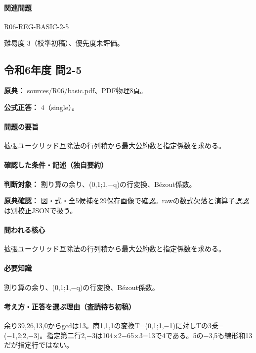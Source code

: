 \paragraph{関連問題} \hyperref[q:r06-reg-basic-2-5]{R06-REG-BASIC-2-5}

\par 難易度 3（校準初稿）、優先度未評価。

\subsection{令和6年度 問2-5}
\label{q:r06-reg-basic-2-5}

\noindent\textbf{原典：} sources/R06/basic.pdf、PDF物理8頁。

\textbf{公式正答：} 4（single）。

\paragraph{問題の要旨} 拡張ユークリッド互除法の行列積から最大公約数と指定係数を求める。

\paragraph{確認した条件・記述（独自要約）}\mbox{}\par

\noindent\textbf{判断対象：} 割り算の余り、(0,1;1,−q)の行変換、Bézout係数。\par

\noindent\textbf{原典確認：} 図・式・全5候補を29保存画像で確認。rawの数式欠落と演算子誤認は別校正JSONで扱う。\par

\paragraph{問われる核心} 拡張ユークリッド互除法の行列積から最大公約数と指定係数を求める。

\paragraph{必要知識} 割り算の余り、(0,1;1,−q)の行変換、Bézout係数。

\paragraph{考え方・正答を選ぶ理由（査読待ち初稿）} 余り39,26,13,0からgcdは13。商1,1,1の変換T=\allowbreak{}(0,1;1,−1)に対しTの3乗=(−1,2;2,−3)。指定第二行2,−3は104×2−65×3=\allowbreak{}13で4である。5の−3,5も線形和13だが指定行ではない。

